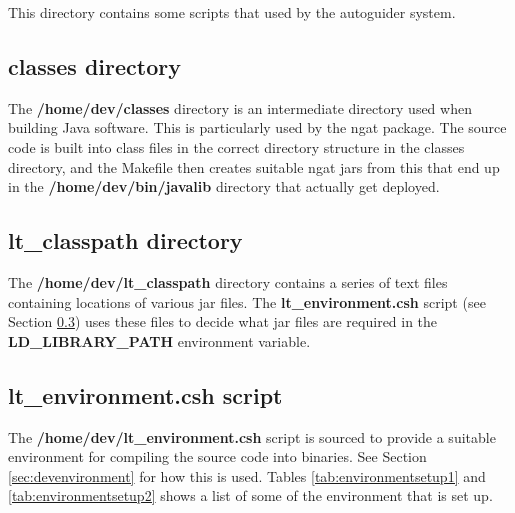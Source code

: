 \documentclass[10pt,a4paper]{article}
\begin{document}
This directory contains some scripts that used by the autoguider system.

\subsection{classes directory}

The {\bf /home/dev/classes} directory is an intermediate directory used when building Java software. This is particularly used by the ngat package. The source code is built into class files in the correct directory structure in the classes directory, and the Makefile then creates suitable ngat jars from this that end up in the {\bf /home/dev/bin/javalib} directory that actually get deployed.

\subsection{lt\_classpath directory}

The {\bf /home/dev/lt\_classpath} directory contains a series of text files containing locations of various jar files.
The {\bf lt\_environment.csh} script (see Section \ref{sec:ltenvironment.csh}) uses these files to decide what jar files are required in the {\bf LD\_LIBRARY\_PATH} environment variable.

\subsection{lt\_environment.csh script}
\label{sec:ltenvironment.csh}

The {\bf /home/dev/lt\_environment.csh} script is sourced to provide a suitable environment for compiling the source code into binaries. See Section \ref{sec:devenvironment} for how this is used. Tables \ref{tab:environmentsetup1} and \ref{tab:environmentsetup2} shows a list of some of the environment that is set up.
\end{document}

